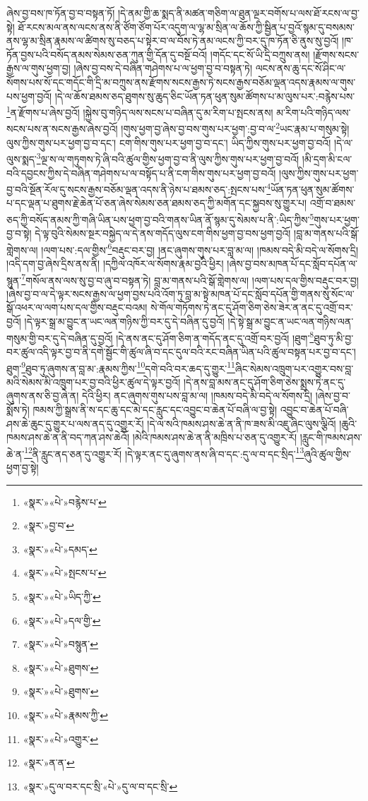 ཞེས་བྱ་བས་ཁ་ཏོན་བྱ་བ་བསྟན་ཏོ། །དེ་ནམ་གྱི་ཆ་སྨད་ནི་མཚན་གཅིག་ལ་ཐུན་ལྔར་བགོས་པ་ལས་ཐོ་རངས་ལ་བྱ་སྟེ། ཐོ་རངས་མལ་ནས་ལངས་ནས་ནི་ཙོག་ཙོག་པོར་འདུག་ལ་ལྷ་མ་སྲིན་ལ་ཆོས་ཀྱི་སྦྱིན་པ་བྱའོ་སྙམ་དུ་བསམས་ནས་ལྷ་མ་སྲིན་རྣམས་ལ་ཚིགས་སུ་བཅད་པ་སྟེར་བ་ལ་བོས་ཏེ་ནམ་ལངས་ཀྱི་བར་དུ་ཁ་ཏོན་ཅི་ནུས་སུ་བྱའོ། །ཁ་ཏོན་བྱས་པའི་བསོད་ནམས་སེམས་ཅན་ཀུན་གྱི་དོན་དུ་བསྔོ་བའོ། །གདོང་དང་སོ་ཡི་དྲི་བཀྲུས་ནས། །རྫོགས་སངས་རྒྱས་ལ་གུས་ཕྱག་བྱ། །ཞེས་བྱ་བས་དེ་བཞིན་གཤེགས་པ་ལ་ཕྱག་བྱ་བ་བསྟན་ཏེ། ལངས་ནས་ཆུ་དང་སོ་ཤིང་ལ་སོགས་པས་སོ་དང་གདོང་གི་དྲི་མ་བཀྲུས་ནས་རྫོགས་སངས་རྒྱས་ཏེ་སངས་རྒྱས་བཅོམ་ལྡན་འདས་རྣམས་ལ་གུས་པས་ཕྱག་བྱའོ། །དེ་ལ་ཆོས་ཐམས་ཅད་ཐུགས་སུ་ཆུད་ཅིང་ཡོན་ཏན་ཕུན་སུམ་ཚོགས་པ་མ་ལུས་པར་:བརྙེས་པས་\footnote{«སྣར་»«པེ་»བརྙེས་པ་}ན་རྫོགས་པ་ཞེས་བྱའོ། །སྐྱེས་བུ་གཉིད་ལས་སངས་པ་བཞིན་དུ་མ་རིག་པ་སྤངས་ནས། མ་རིག་པའི་གཉིད་ལས་སངས་པས་ན་སངས་རྒྱས་ཞེས་བྱའོ། །གུས་ཕྱག་བྱ་ཞེས་བྱ་བས་གུས་པར་ཕྱག་:བྱ་བ་ལ་\footnote{«སྣར་»བྱ་བ་}ཡང་རྣམ་པ་གསུམ་སྟེ། ལུས་ཀྱིས་གུས་པར་ཕྱག་བྱ་བ་དང་། ངག་གིས་གུས་པར་ཕྱག་བྱ་བ་དང་། ཡིད་ཀྱིས་གུས་པར་ཕྱག་བྱ་བའོ། །དེ་ལ་ལུས་སྨད་\footnote{«སྣར་»«པེ་»དམད་}ལྔ་ས་ལ་གཏུགས་ཏེ་ཞི་བའི་ཚུལ་གྱིས་ཕྱག་བྱ་བ་ནི་ལུས་ཀྱིས་གུས་པར་ཕྱག་བྱ་བའོ། །མི་དྲག་མི་ངལ་བའི་དབྱངས་ཀྱིས་དེ་བཞིན་གཤེགས་པ་ལ་བསྟོད་པ་ནི་ངག་གིས་གུས་པར་ཕྱག་བྱ་བའོ། །ལུས་ཀྱིས་གུས་པར་ཕྱག་བྱ་བའི་སྔོན་རོལ་དུ་སངས་རྒྱས་བཅོམ་ལྡན་འདས་ནི་ཉེས་པ་ཐམས་ཅད་:སྤངས་པས་\footnote{«སྣར་»«པེ་»སྤངས་པ་}ཡོན་ཏན་ཕུན་སུམ་ཚོགས་པ་དང་ལྡན་པ་ཐུགས་རྗེ་ཆེན་པོ་ཅན་ཞེས་སེམས་ཅན་ཐམས་ཅད་ཀྱི་མགོན་དང་སྐྱབས་སུ་གྱུར་པ། འགྲོ་བ་ཐམས་ཅད་ཀྱི་བསོད་ནམས་ཀྱི་གཞི་ཡིན་པས་ཕྱག་བྱ་བའི་གནས་ཡིན་ནོ་སྙམ་དུ་སེམས་པ་ནི་:ཡིད་ཀྱིས་\footnote{«སྣར་»«པེ་»ཡིད་ཀྱི་}གུས་པར་ཕྱག་བྱ་བ་སྟེ། དེ་ལྟ་བུའི་སེམས་སྔར་བསྐྱེད་ལ་དེ་ནས་གདོད་ལུས་ངག་གིས་ཕྱག་བྱ་བས་ཕྱག་བྱའོ། །བླ་མ་གནས་པའི་སྒོ་གླེགས་ལ། །ལག་པས་:དལ་གྱིས་\footnote{«སྣར་»«པེ་»དལ་གྱི་}བརྡུང་བར་བྱ། །ནང་ཞུགས་གུས་པར་བླ་མ་ལ། །ཁམས་བདེ་མི་བདེ་ལ་སོགས་དྲི། །འདི་དག་བྱ་ཞེས་དྲིས་ནས་ནི། །དཀྱིལ་འཁོར་ལ་སོགས་རྣམ་བྱའི་ཕྱིར། །ཞེས་བྱ་བས་མཁན་པོ་དང་སློབ་དཔོན་ལ་སྙུན་\footnote{«སྣར་»«པེ་»བསྙུན་}གསོལ་ནས་ལས་སུ་བྱ་བ་ཞུ་བ་བསྟན་ཏེ། བླ་མ་གནས་པའི་སྒོ་གླེགས་ལ། །ལག་པས་དལ་གྱིས་བརྡུང་བར་བྱ། །ཞེས་བྱ་བ་ལ་དེ་ལྟར་སངས་རྒྱས་ལ་ཕྱག་བྱས་པའི་འོག་ཏུ་བླ་མ་སྟེ་མཁན་པོ་དང་སློབ་དཔོན་གྱི་གནས་སུ་སོང་ལ་སྒོ་འཕར་ལ་ལག་པས་དལ་གྱིས་བརྡུང་བའམ། སེ་གོལ་གཏོགས་ཏེ་ནང་དུ་ཤོག་ཅིག་ཅེས་ཟེར་ན་ནང་དུ་འགྲོ་བར་བྱའོ། །དེ་ལྟར་སྒྲ་མ་བྱུང་ན་ཡང་ལན་གཉིས་ཀྱི་བར་དུ་དེ་བཞིན་དུ་བྱའོ། །དེ་སྟེ་སྒྲ་མ་བྱུང་ན་ཡང་ལན་གཉིས་ལན་གསུམ་གྱི་བར་དུ་དེ་བཞིན་དུ་བྱའོ། །དེ་ནས་ནང་དུ་ཤོག་ཅིག་ན་གདོད་ནང་དུ་འགྲོ་བར་བྱའོ། །ཐུག་\footnote{«སྣར་»«པེ་»ཐུགས་}ཐུབ་ཏུ་མི་བྱ་བར་ཚུལ་འདི་ལྟར་བྱ་བ་ནི་དགེ་སྦྱོང་གི་ཚུལ་ཞི་བ་དང་དུལ་བའི་རང་བཞིན་ཡིན་པའི་ཚུལ་བསྟན་པར་བྱ་བ་དང་། ཐུག་\footnote{«སྣར་»«པེ་»ཐུགས་}ཐུབ་ཏུ་ཞུགས་ན་བླ་མ་:རྣམས་ཀྱིས་\footnote{«སྣར་»«པེ་»རྣམས་ཀྱི་}དགེ་བའི་བར་ཆད་དུ་གྱུར་\footnote{«སྣར་»«པེ་»འགྱུར་}ཞིང་སེམས་འཁྲུག་པར་འགྱུར་བས་བླ་མའི་སེམས་མི་འཁྲུག་པར་བྱ་བའི་ཕྱིར་ཚུལ་དེ་ལྟར་བྱའོ། །དེ་ནས་བླ་མས་ནང་དུ་ཤོག་ཅིག་ཅེས་སྨྲས་ཏེ་ནང་དུ་ཞུགས་ནས་ཅི་བྱ་ཞེ་ན། དེའི་ཕྱིར། ནང་ཞུགས་གུས་པས་བླ་མ་ལ། །ཁམས་བདེ་མི་བདེ་ལ་སོགས་དྲི། །ཞེས་བྱ་བ་སྨོས་ཏེ། ཁམས་ཀྱི་སྒྲས་ནི་ས་དང་ཆུ་དང་མེ་དང་རླུང་དང་འབྱུང་བ་ཆེན་པོ་བཞི་ལ་བྱ་སྟེ། འབྱུང་བ་ཆེན་པོ་བཞི་ཤས་ཆེ་ཆུང་དུ་གྱུར་པ་ལས་ནད་དུ་འགྱུར་རོ། །དེ་ལ་སའི་ཁམས་ཤས་ཆེ་ན་ནི་ཁ་ཟས་མི་འཇུ་ཞིང་ལུས་ལྕིའོ། །ཆུའི་ཁམས་ཤས་ཆེ་ན་ནི་བད་ཀན་ཤས་ཆེའོ། །མེའི་ཁམས་ཤས་ཆེ་ན་ནི་མཁྲིས་པ་ཅན་དུ་འགྱུར་རོ། །རླུང་གི་ཁམས་ཤས་ཆེ་ན་\footnote{«སྣར་»ན་ན་}ནི་རླུང་ནད་ཅན་དུ་འགྱུར་རོ། །དེ་ལྟར་ནང་དུ་ཞུགས་ནས་ཞི་བ་དང་:དུ་ལ་བ་དང་སྲིད་\footnote{«སྣར་»དུ་ལ་བར་དང་སྲི་«པེ་»དུ་ལ་བ་དང་སྲི་}ཞུའི་ཚུལ་གྱིས་ཕྱག་བྱ་སྟེ། 